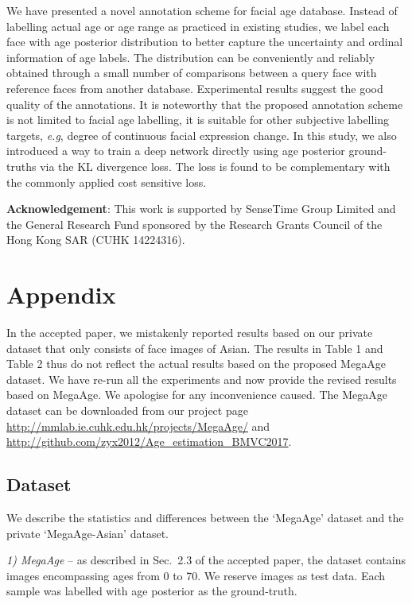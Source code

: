 \documentclass{bmvc2k}
\def\eg{\emph{e.g}\bmvaOneDot}
\begin{document}
We have presented a novel annotation scheme for facial age database. Instead of labelling actual age or age range as practiced in existing studies, we label each face with age posterior distribution to better capture the uncertainty and ordinal information of age labels. The distribution can be conveniently and reliably obtained through a small number of comparisons between a query face with reference faces from another database. Experimental results suggest the good quality of the annotations. 
It is noteworthy that the proposed annotation scheme is not limited to facial age labelling, it is suitable for other subjective labelling targets, \eg, degree of continuous facial expression change.
In this study, we also introduced a way to train a deep network directly using age posterior ground-truths via the KL divergence loss. The loss is found to be complementary with the commonly applied cost sensitive loss. 

\vspace{0.1cm}
\noindent
\textbf{Acknowledgement}: This work is supported by SenseTime Group Limited and the General Research Fund sponsored by the Research Grants Council of the Hong Kong SAR (CUHK 14224316). 


\newpage
\section*{Appendix}


In the accepted paper, we mistakenly reported results based on our private dataset that only consists of face images of Asian. The results in Table 1 and Table 2 thus do not reflect the actual results based on the proposed MegaAge dataset. We have re-run all the experiments and now provide the revised results based on MegaAge. We apologise for any inconvenience caused.
The MegaAge dataset can be downloaded from our project page \url{http://mmlab.ie.cuhk.edu.hk/projects/MegaAge/} and \url{http://github.com/zyx2012/Age_estimation_BMVC2017}. 

\subsection*{Dataset}
\label{sec:experiments}


We describe the statistics and differences between the `MegaAge' dataset and the private `MegaAge-Asian' dataset.

\vspace{0.1cm}
\noindent
\textsl{1) MegaAge} -- as described in Sec.~2.3 of the accepted paper, the dataset contains  images encompassing ages from 0 to 70. We reserve  images as test data. Each sample was labelled with age posterior as the ground-truth.
\end{document}
